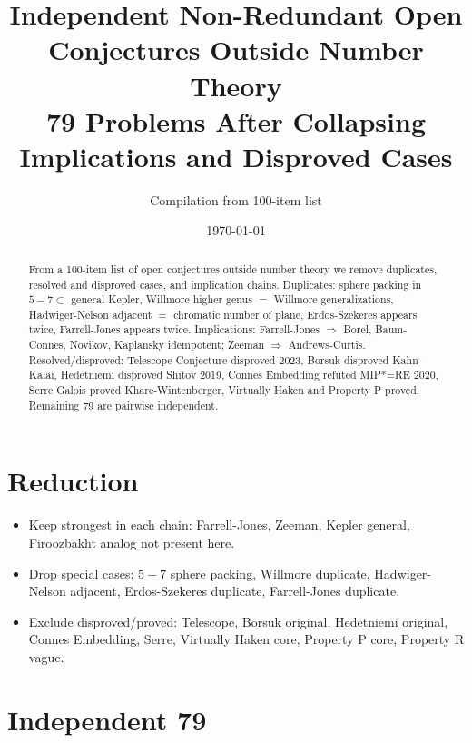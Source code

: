 \documentclass[aps,prd,amsmath,amssymb,twocolumn,superscriptaddress]{revtex4-2}
\begin{document}
\title{Independent Non-Redundant Open Conjectures Outside Number Theory\\
79 Problems After Collapsing Implications and Disproved Cases}
\author{Compilation from 100-item list}
\date{\today}

\begin{abstract}
From a 100-item list of open conjectures outside number theory we remove duplicates, resolved and disproved cases, and implication chains. Duplicates: sphere packing in $5\!-\!7\subset$ general Kepler, Willmore higher genus $=$ Willmore generalizations, Hadwiger-Nelson adjacent $=$ chromatic number of plane, Erdos-Szekeres appears twice, Farrell-Jones appears twice. Implications: Farrell-Jones $\Rightarrow$ Borel, Baum-Connes, Novikov, Kaplansky idempotent; Zeeman $\Rightarrow$ Andrews-Curtis. Resolved/disproved: Telescope Conjecture disproved 2023, Borsuk disproved Kahn-Kalai, Hedetniemi disproved Shitov 2019, Connes Embedding refuted MIP*=RE 2020, Serre Galois proved Khare-Wintenberger, Virtually Haken and Property P proved. Remaining 79 are pairwise independent.
\end{abstract}

\maketitle

\section{Reduction}
\begin{itemize}
\item Keep strongest in each chain: Farrell-Jones, Zeeman, Kepler general, Firoozbakht analog not present here.
\item Drop special cases: $5\!-\!7$ sphere packing, Willmore duplicate, Hadwiger-Nelson adjacent, Erdos-Szekeres duplicate, Farrell-Jones duplicate.
\item Exclude disproved/proved: Telescope, Borsuk original, Hedetniemi original, Connes Embedding, Serre, Virtually Haken core, Property P core, Property R vague.
\end{itemize}

\section{Independent 79}
\end{document}
